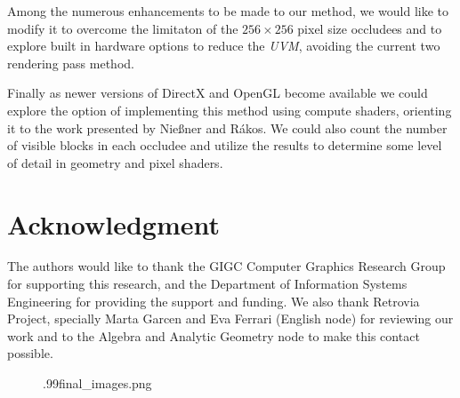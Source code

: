 \documentclass[10pt, conference]{IEEEtran}
\begin{document}
Among the numerous enhancements to be made to our method, we would like to modify it to overcome the limitaton of the 
$256 \times 256$ pixel size occludees and to explore built in hardware options to reduce the \emph{UVM}, avoiding the current two rendering pass method.\

Finally as newer versions of DirectX and OpenGL become available we could explore the option of implementing this method using compute shaders, 
orienting it  to the work presented by Nie{\ss}ner\cite{occlusion_culling_tessellation} and R\'{a}kos\cite{rakos}. 
We could also count the number of visible blocks in each occludee and utilize the results to determine some level of detail in geometry and pixel shaders.



\iffinal
\section*{Acknowledgment}
%
The authors would like to thank the GIGC Computer Graphics Research Group for supporting this research, and the Department of Information Systems 
Engineering for providing the support and funding. We also thank Retrovia Project, specially Marta Garcen and Eva Ferrari (English node) for reviewing our work and to the Algebra and Analytic Geometry node to make this contact possible.
\fi














\begin{figure}[!hbp]
	{.99}{final_images.png}
\end{figure}
\end{document}
